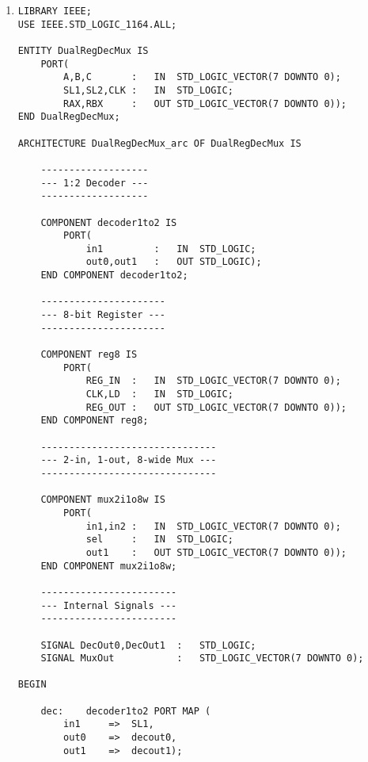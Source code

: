 \begin{enumerate}
\begin{lstlisting}
	And1Out	<=	LDB AND NOT RD;
	AND2Out	<=	LDA AND RD;
	
	mux1:	mux2i1o8w PORT MAP(
		in1		=>	X,
		in2		=>	Y,
		sel		=>	S1,
		out1	=>	Mux1Out);
		
	mux2:	mux2i1o8w PORT MAP(
		in1		=>	X,
		in2		=>	RegBOut,
		sel		=>	S0,
		out1	=>	Mux2Out);
		
	regA:	reg8 PORT MAP(
		REG_IN	=>	Mux2Out,
		CLK		=>	CLK,
		LD		=>	And2Out,
		REG_OUT	=>	RegAOut);
		
	regB:	reg8 PORT MAP(
		REG_IN	=>	Mux1Out,
		CLK		=>	CLK,
		LD		=>	And1Out,
		REG_OUT	=>	RegBOut);
		
	RA	<=	RegAOut;
	RB	<=	RegBOut;
	
END DualMuxDualReg_arc;
	\end{lstlisting}
	
	\item \begin{lstlisting}
LIBRARY IEEE;
USE IEEE.STD_LOGIC_1164.ALL;

ENTITY DualRegDecMux IS
	PORT(
		A,B,C		:	IN	STD_LOGIC_VECTOR(7 DOWNTO 0);
		SL1,SL2,CLK	:	IN	STD_LOGIC;
		RAX,RBX		:	OUT	STD_LOGIC_VECTOR(7 DOWNTO 0));
END DualRegDecMux;

ARCHITECTURE DualRegDecMux_arc OF DualRegDecMux IS
	
	-------------------
	--- 1:2 Decoder ---
	-------------------
	
	COMPONENT decoder1to2 IS
		PORT(
			in1			:	IN	STD_LOGIC;
			out0,out1	:	OUT	STD_LOGIC);
	END COMPONENT decoder1to2;
	
	----------------------
	--- 8-bit Register ---
	----------------------

	COMPONENT reg8 IS
		PORT(
			REG_IN	:	IN	STD_LOGIC_VECTOR(7 DOWNTO 0);
			CLK,LD	:	IN	STD_LOGIC;
			REG_OUT	:	OUT	STD_LOGIC_VECTOR(7 DOWNTO 0));
	END COMPONENT reg8;
	
	-------------------------------
	--- 2-in, 1-out, 8-wide Mux ---
	-------------------------------
	
	COMPONENT mux2i1o8w IS
		PORT(
			in1,in2	:	IN	STD_LOGIC_VECTOR(7 DOWNTO 0);
			sel		:	IN	STD_LOGIC;
			out1	:	OUT	STD_LOGIC_VECTOR(7 DOWNTO 0));
	END COMPONENT mux2i1o8w;
	
	------------------------
	--- Internal Signals ---
	------------------------
	
	SIGNAL DecOut0,DecOut1	:	STD_LOGIC;
	SIGNAL MuxOut			:	STD_LOGIC_VECTOR(7 DOWNTO 0);
	
BEGIN
	
	dec:	decoder1to2 PORT MAP (
		in1		=>	SL1,
		out0	=>	decout0,
		out1	=>	decout1);
		

\end{lstlisting}
\end{enumerate}
